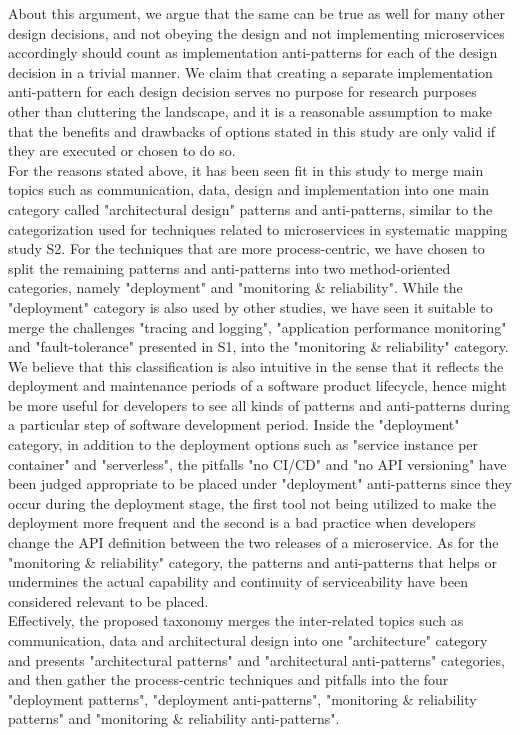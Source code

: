 \documentclass{Configuration_Files/PoliMi3i_thesis}
\begin{document}
About this argument, we argue that the same can be true as well for many other design decisions, and not obeying the design and not implementing microservices accordingly should count as implementation anti-patterns for each of the design decision in a trivial manner.
We claim that creating a separate implementation anti-pattern for each design decision serves no purpose for research purposes other than cluttering the landscape, and it is a reasonable assumption to make that the benefits and drawbacks of options stated in this study are only valid if they are executed or chosen to do so.
\\
For the reasons stated above, it has been seen fit in this study to merge main topics such as communication, data, design and implementation into one main category called "architectural design" patterns and anti-patterns, similar to the categorization used for techniques related to microservices in systematic mapping study S2.
For the techniques that are more process-centric, we have chosen to split the remaining patterns and anti-patterns into two method-oriented categories, namely "deployment" and "monitoring \& reliability".
While the "deployment" category is also used by other studies, we have seen it suitable to merge the challenges "tracing and logging", "application performance monitoring" and "fault-tolerance" presented in S1, into the "monitoring \& reliability" category.
We believe that this classification is also intuitive in the sense that it reflects the deployment and maintenance periods of a software product lifecycle, hence might be more useful for developers to see all kinds of patterns and anti-patterns during a particular step of software development period.
Inside the "deployment" category, in addition to the deployment options such as "service instance per container" and "serverless", the pitfalls "no CI/CD" and "no API versioning" have been judged appropriate to be placed under "deployment" anti-patterns since they occur during the deployment stage, the first tool not being utilized to make the deployment more frequent and the second is a bad practice when developers change the API definition between the two releases of a microservice.
As for the "monitoring \& reliability" category, the patterns and anti-patterns that helps or undermines the actual capability and continuity of serviceability have been considered relevant to be placed.
\\
Effectively, the proposed taxonomy merges the inter-related topics such as communication, data and architectural design into one "architecture" category and presents "architectural patterns" and "architectural anti-patterns" categories, and then gather the process-centric techniques and pitfalls into the four "deployment patterns", "deployment anti-patterns", "monitoring \& reliability patterns" and "monitoring \& reliability anti-patterns".
\end{document}
